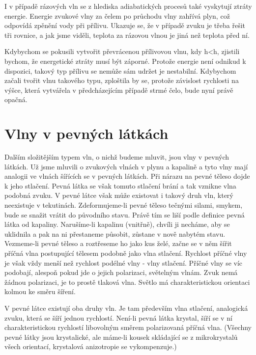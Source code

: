  
  I v případě rázových vln se z hlediska adiabatických procesů také vyskytují ztráty energie. 
  Energie zvukové vlny za čelem po průchodu vlny zahřívá plyn, což odpovídá zpěnění vody při 
  přílivu. Ukazuje se, že v případě zvuku je třeba řešit tři rovnice, a jak jsme viděli, teplota za 
  rázovou vlnou je jiná než teplota před ní.
  
  Kdybychom se pokusili vytvořit převrácenou přílivovou vlnu, kdy h<h, zjistili bychom, že 
  energetické ztráty musí být záporné. Protože energie není odnikud k dispozici, takový typ přílivu 
  se nemůže sám udržet je nestabilní. Kdybychom začali tvořit vlnu takového typu, zploštila by se, 
  protože závislost rychlosti na výšce, která vytvářela v předcházejícím případě strmé čelo, bude 
  nyní právě opačná.

\section{Vlny v pevných látkách}\label{fyz:IchapLIsecIII}
  Dalším složitějším typem vln, o nichž budeme mluvit, jsou vlny v pevných látkách. Už jsme mluvili 
  o zvukových vlnách v plynu a kapalině a tyto vlny mají analogii ve vlnách šířících se v pevných 
  látkách. Při nárazu na pevné těleso dojde k jeho stlačení. Pevná látka se však tomuto stlačení 
  brání a tak vznikne vlna podobná zvuku. V pevné látce však může existovat i takový druh vln, 
  který neexistuje v tekutinách. Zdeformujeme-li pevné těleso tečnými silami, smykem, bude se 
  snažit vrátit do původního stavu. Právě tím se liší podle definice pevná látka od kapaliny. 
  Narušíme-li kapalinu (vnitřně), chvíli ji necháme, aby se uklidnila a pak na ni přestaneme 
  působit, zůstane v nově nabytém stavu. Vezmeme-li pevné těleso a roztřeseme ho jako kus želé, 
  začne se v něm šířit příčná vlna postupující tělesem podobně jako vlna stlačení. Rychlost příčné 
  vlny je však vždy menší než rychlost podélné vlny - vlny stlačení. Příčné vlny se víc podobají, 
  alespoň pokud jde o jejich polarizaci, světelným vlnám. Zvuk nemá žádnou polarizaci, je to prostě 
  tlaková vlna. Světlo má charakteristickou orientaci kolmou ke směru šíření. 
  
  V pevné látce existují oba druhy vln. Je tam především vlna stlačení, analogická zvuku, která se 
  šíří jednou rychlostí. Není-li pevná látka krystal, šíří se v ní charakteristickou rychlostí 
  libovolným směrem polarizovaná příčná vlna. (Všechny pevné látky jsou krystalické, ale máme-li 
  kousek skládající se z mikrokrystalů všech orientací, krystalová anizotropie se vykompenzuje.) 
  
